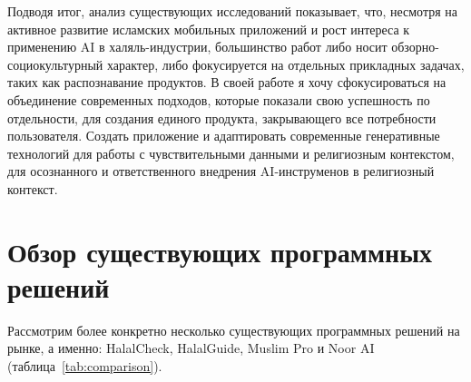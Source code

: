 Подводя итог, анализ существующих исследований показывает, что, несмотря на активное развитие исламских мобильных приложений и рост интереса к применению AI в халяль-индустрии, большинство работ либо носит обзорно-социокультурный характер, либо фокусируется на отдельных прикладных задачах, таких как распознавание продуктов. В своей работе я хочу сфокусироваться на объединение современных подходов, которые показали свою успешность по отдельности, для создания единого продукта, закрывающего все потребности пользователя. Создать приложение и адаптировать современные генеративные технологий для работы с чувствительными данными и религиозным контекстом, для осознанного и ответственного внедрения AI-инструменов в религиозный контекст.


\section{Обзор существующих программных решений}


Рассмотрим более конкретно несколько существующих программных решений на рынке, а именно: HalalCheck, HalalGuide, Muslim Pro и Noor AI (таблица~\ref{tab:comparison}).


